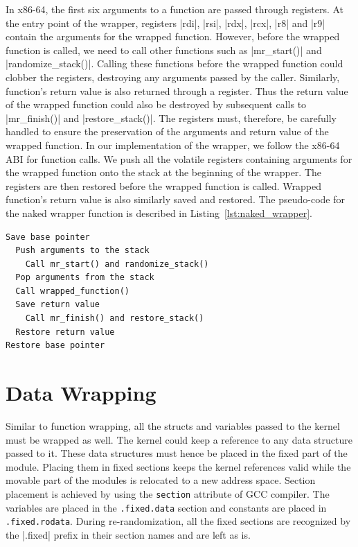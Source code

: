 In x86-64, the first six arguments to a function are passed through registers. At the entry point of the wrapper, registers |rdi|, |rsi|, |rdx|, |rcx|, |r8| and |r9| contain the arguments for the wrapped function. However, before the wrapped function is called, we need to call other functions such as |mr_start()| and |randomize_stack()|. Calling these functions before the wrapped function could clobber the registers, destroying any arguments passed by the caller. Similarly, function's return value is also returned through a register. Thus the return value of the wrapped function could also be destroyed by subsequent calls to |mr_finish()| and |restore_stack()|. The registers must, therefore, be carefully handled to ensure the preservation of the arguments and return value of the wrapped function. In our implementation of the wrapper, we follow the x86-64 ABI for function calls. We push all the volatile registers containing arguments for the wrapped function onto the stack at the beginning of the wrapper. The registers are then restored before the wrapped function is called. Wrapped function's return value is also similarly saved and restored. The pseudo-code for the naked wrapper function is described in Listing~\ref{lst:naked_wrapper}.

\lstset{}
\begin{lstlisting}[frame=single, caption={Naked Wrapper Function},label={lst:naked_wrapper}]
Save base pointer
  Push arguments to the stack
    Call mr_start() and randomize_stack()
  Pop arguments from the stack
  Call wrapped_function()
  Save return value
    Call mr_finish() and restore_stack()
  Restore return value
Restore base pointer
\end{lstlisting}

\section{Data Wrapping} \label{se:data_wrapping}
Similar to function wrapping, all the structs and variables passed to the kernel must be wrapped as well. The kernel could keep a reference to any data structure passed to it. These data structures must hence be placed in the fixed part of the module. Placing them in fixed sections keeps the kernel references valid while the movable part of the modules is relocated to a new address space. Section placement is achieved  by using the \verb|section| attribute of GCC compiler. The variables are placed in the \verb|.fixed.data| section and constants are placed in \verb|.fixed.rodata|. During re-randomization, all the fixed sections are recognized by the |.fixed| prefix in their section names and are left as is.

